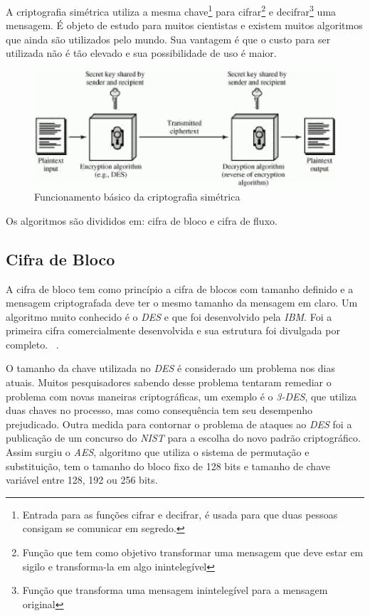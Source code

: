A criptografia simétrica utiliza a mesma chave\footnote{Entrada para as funções cifrar e decifrar, é usada para que duas pessoas consigam se comunicar em segredo.} para cifrar\footnote{Função que tem como objetivo transformar uma mensagem que deve estar em sigilo e transforma-la em algo inintelegível} e decifrar\footnote{Função que transforma uma mensagem inintelegível para a mensagem original} uma mensagem. É objeto de estudo para muitos cientistas e existem muitos algoritmos que ainda são utilizados pelo mundo. Sua vantagem é que o custo para ser utilizada não é tão elevado e sua possibilidade de uso é maior. 

\begin{figure}[h]
\centering
\includegraphics[scale=0.5]
{figuras/SymmetricCipher.eps}
\caption[Funcionamento básico da criptografia simétrica] {Funcionamento básico da criptografia simétrica\protect\footnotemark}
\end{figure}

Os algoritmos são divididos em: cifra de bloco e cifra de fluxo.

\subsection{Cifra de Bloco}
\label{block-cipher}

A cifra de bloco tem como princípio a cifra de blocos com tamanho definido e a mensagem criptografada deve ter o mesmo tamanho da mensagem em claro. Um algoritmo muito conhecido é o \textit{DES} e que foi desenvolvido pela \textit{IBM}. Foi a primeira cifra comercialmente desenvolvida e sua estrutura foi divulgada por completo. ~\cite{alex-biryukov}. 

O tamanho da chave utilizada no \textit{DES} é considerado um problema nos dias atuais. Muitos pesquisadores sabendo desse problema tentaram remediar o problema com novas maneiras criptográficas, um exemplo é o \textit{3-DES}, que utiliza duas chaves no processo, mas como consequência tem seu desempenho prejudicado. Outra medida para contornar o problema de ataques ao \textit{DES} foi a publicação de um concurso do \textit{NIST} para a escolha do novo padrão criptográfico. Assim surgiu o \textit{AES}, algoritmo que utiliza o sistema de permutação e substituição, tem o tamanho do bloco fixo de 128 bits e tamanho de chave variável entre 128, 192 ou 256 bits. 

